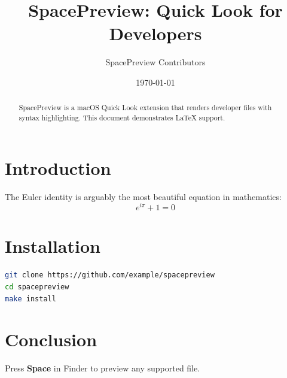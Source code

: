 \documentclass[12pt,a4paper]{article}
\title{SpacePreview: Quick Look for Developers}
\author{SpacePreview Contributors}
\date{\today}
\begin{document}
\maketitle

\begin{abstract}
SpacePreview is a macOS Quick Look extension that renders developer files
with syntax highlighting. This document demonstrates \LaTeX{} support.
\end{abstract}

\section{Introduction}

The Euler identity is arguably the most beautiful equation in mathematics:
\begin{equation}
    e^{i\pi} + 1 = 0
\end{equation}

\section{Installation}

\begin{lstlisting}[language=bash, caption={Install via make}]
git clone https://github.com/example/spacepreview
cd spacepreview
make install
\end{lstlisting}

\section{Conclusion}

Press \textbf{Space} in Finder to preview any supported file.
\end{document}
